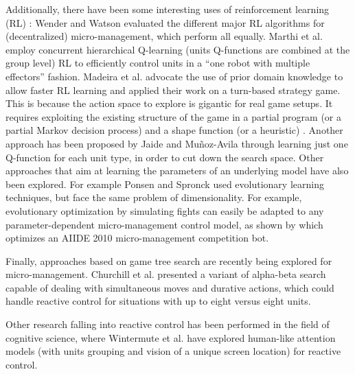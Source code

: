 \documentclass[journal]{IEEEtran}
\begin{document}
Additionally, there have been some interesting uses of reinforcement learning (RL) \cite{Sutton}: 
Wender and Watson \cite{WenderRL} evaluated the different major RL algorithms for (decentralized) micro-management, which perform all equally. Marthi et al. \cite{Marthi05} employ concurrent hierarchical Q-learning (units Q-functions are combined at the group level) RL to efficiently control units in a ``one robot with multiple effectors'' fashion. Madeira et al. \cite{Madeira06} advocate the use of prior domain knowledge to allow faster RL learning and applied their work on a turn-based strategy game. This is because the action space to explore is gigantic for real game setups. It requires exploiting the existing structure of the game in a partial program (or a partial Markov decision process) and a shape function (or a heuristic) \cite{Marthi05}. Another approach has been proposed by Jaide and Mu{\~n}oz-Avila \cite{jaidee2012classq} through learning just one Q-function for each unit type, in order to cut down the search space. Other approaches that aim at learning the parameters of an underlying model have also been explored. For example Ponsen and Spronck \cite{GA} used evolutionary learning techniques, but face the same problem of dimensionality. For example, evolutionary optimization by simulating fights can easily be adapted to any parameter-dependent micro-management control model, as shown by \cite{OthmanSimu} which optimizes an AIIDE 2010 micro-management competition bot.

Finally, approaches based on game tree search are recently being explored for micro-management. Churchill et al. \cite{churchill2012AIIDE} presented a variant of alpha-beta search capable of dealing with simultaneous moves and durative actions, which could handle reactive control for situations with up to eight versus eight units. 

Other research falling into reactive control has been performed in the field of cognitive science, where Wintermute et al. \cite{SORTS} have explored human-like attention models (with units grouping and vision of a unique screen location) for reactive control.
\end{document}
